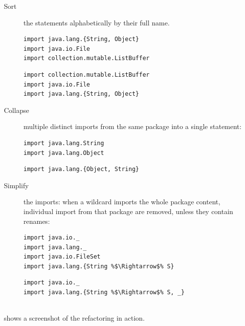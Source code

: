 \documentclass[10pt,a4paper,oneside]{scrreprt}
\begin{document}
\begin{description}
  \item[Sort] the statements alphabetically by their full name.
\begin{multicols}{2}
\begin{lstlisting}
import java.lang.{String, Object}
import java.io.File
import collection.mutable.ListBuffer
\end{lstlisting}
\begin{lstlisting}
import collection.mutable.ListBuffer
import java.io.File
import java.lang.{String, Object}
\end{lstlisting}
\end{multicols}

  \item[Collapse] multiple distinct imports from the same package into a single statement:
\begin{multicols}{2}
\begin{lstlisting}
import java.lang.String
import java.lang.Object
\end{lstlisting}
\begin{lstlisting}
import java.lang.{Object, String}

\end{lstlisting}
\end{multicols}

  \item[Simplify] the imports: when a wildcard imports the whole package content, individual import from that package are removed, unless they contain renames:
\begin{multicols}{2}
\begin{lstlisting}
import java.io._
import java.lang._
import java.io.FileSet
import java.lang.{String %$\Rightarrow$% S}
\end{lstlisting}
\needspace{\baselineskip}
\begin{lstlisting}
import java.io._
import java.lang.{String %$\Rightarrow$% S, _}


\end{lstlisting}
\end{multicols}
\end{description}

 shows a screenshot of the refactoring in action.
\end{document}

